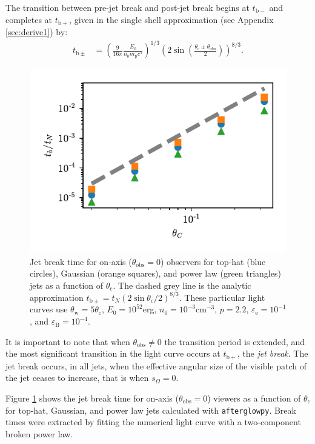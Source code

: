 \documentclass[twocolumn]{aastex62}
\newcommand{\afterglowpy}{{\tt afterglowpy}}
\newcommand{\tbm}{\ensuremath{t_{\mathrm{b-}}}}
\newcommand{\tbp}{\ensuremath{t_{\mathrm{b+}}}}
\newcommand{\tbpm}{\ensuremath{t_{\mathrm{b\pm}}}}
\newcommand{\thobs}{\ensuremath{\theta_{\mathrm{obs}}}}
\newcommand{\thW}{\ensuremath{\theta_{\mathrm{w}}}}
\newcommand{\thC}{\ensuremath{\theta_{\mathrm{c}}}}
\newcommand{\epse}{\ensuremath{\varepsilon_{\mathrm{e}}}}
\newcommand{\epsB}{\ensuremath{\varepsilon_{\mathrm{B}}}}
\newcommand{\Mp}{\ensuremath{m_{\mathrm{p}}}}
\newcommand{\som}{\ensuremath{s_{\Omega}}}
\begin{document}
The transition between pre-jet break and post-jet break begins at $\tbm$ and completes at $\tbp$, given in the single shell approximation (see Appendix \ref{sec:derive1}) by:
\begin{align}
	\tbpm &= \left(\frac{9}{16\pi} \frac{E_0}{n_0 \Mp c^5}\right)^{1/3} \left( 2 \sin \left(\frac{\thC\pm\thobs}{2}\right)\right)^{8/3} .\label{eq:tbpm}
\end{align}
\begin{figure}
	\includegraphics[width=\columnwidth]{figs/breaks_alignedOA_all.pdf}
	\caption{Jet break time for on-axis ($\thobs=0$) observers for top-hat (blue circles), Gaussian (orange squares), and power law (green triangles) jets as a function of $\thC$. The dashed grey line is the analytic approximation $\tbpm = t_N (2\sin \thC/2)^{8/3}$. These particular light curves use $\thW = 5 \thC$, $E_0 = 10^{52}$erg, $n_0=10^{-3}$cm$^{-3}$, $p=2.2$, $\epse = 10^{-1}$, and $\epsB = 10^{-4}$. \label{fig:tbOA}}
\end{figure}

It is important to note that when $\thobs \neq 0$ the transition period is extended, and the most significant transition in the light curve occurs at $\tbp$, the \emph{jet break}.  The jet break occurs, in all jets, when the effective angular size of the visible patch of the jet ceases to increase, that is when $\som = 0$.  

Figure \ref{fig:tbOA} shows the jet break time for on-axis ($\thobs = 0$) viewers as a function of $\thC$ for top-hat, Gaussian, and power law jets calculated with \afterglowpy{}. Break times were extracted by fitting the numerical light curve with a two-component broken power law.
\end{document}
